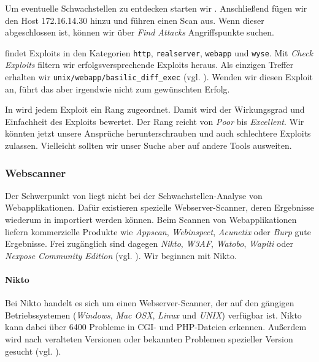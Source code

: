 Um eventuelle Schwachstellen zu entdecken starten wir \Armitage{}. Anschließend
fügen wir den Host 172.16.14.30 hinzu und führen einen Scan aus. Wenn dieser
abgeschlossen ist, können wir über \emph{\glqq{}Find Attacks\grqq{}}
Angriffspunkte suchen.

\Armitage{} findet Exploits in den Kategorien \texttt{http},
\texttt{realserver}, \texttt{webapp} und \texttt{wyse}. Mit \emph{\glqq{}Check
  Exploits\grqq{}} filtern wir erfolgsversprechende Exploits heraus. Als
einzigen Treffer erhalten wir \texttt{unix/webapp/basilic\_diff\_exec}
(vgl. ). Wenden wir diesen Exploit an, führt das aber
irgendwie nicht zum gewünschten Erfolg.


In \Metasploit{} wird jedem Exploit ein Rang zugeordnet. Damit wird der
Wirkungsgrad und Einfachheit des Exploits bewertet. Der Rang reicht von
\emph{Poor} bis \emph{Excellent}. Wir könnten jetzt unsere Ansprüche
herunterschrauben und auch schlechtere Exploits zulassen. Vielleicht sollten wir
unser Suche aber auf andere Tools ausweiten.


\subsubsection{Webscanner}

Der Schwerpunkt von \Metasploit{} liegt nicht bei der Schwachstellen-Analyse von
Webapplikationen. Dafür existieren spezielle Webserver-Scanner, deren Ergebnisse
wiederum in \Metasploit{} importiert werden können. Beim Scannen von
Webapplikationen liefern kommerzielle Produkte wie \emph{Appscan},
\emph{Webinspect}, \emph{Acunetix} oder \emph{Burp} gute Ergebnisse. Frei
zugänglich sind dagegen \emph{Nikto}, \emph{W3AF}, \emph{Watobo}, \emph{Wapiti}
oder \emph{Nexpose Community Edition} (vgl. \cite[S.~281]{metahandbuch}). Wir
beginnen mit Nikto.

\paragraph{Nikto}

Bei Nikto handelt es sich um einen Webserver-Scanner, der auf den gängigen
Betriebssystemen (\emph{Windows}, \emph{Mac OSX}, \emph{Linux} und \emph{UNIX})
verfügbar ist. Nikto kann dabei über 6400 Probleme in CGI- und PHP-Dateien
erkennen. Außerdem wird nach veralteten Versionen oder bekannten Problemen
spezieller Version gesucht (vgl. \cite{Nikto}).

